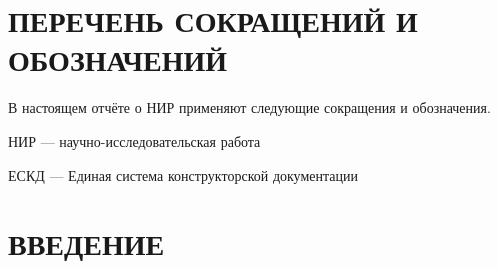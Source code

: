 \section*{ПЕРЕЧЕНЬ СОКРАЩЕНИЙ И ОБОЗНАЧЕНИЙ}

В настоящем отчёте о НИР применяют следующие сокращения и обозначения.

НИР — научно-исследовательская работа

ЕСКД — Единая система конструкторской документации

\section*{ВВЕДЕНИЕ}
